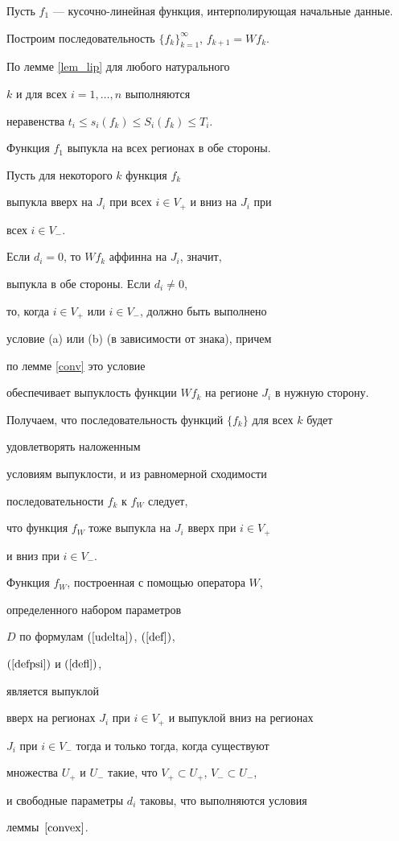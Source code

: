 \begin{pf}


Пусть $f_1$ --- кусочно-линейная функция, интерполирующая начальные данные.


Построим последовательность $\{f_k\}_{k=1}^{\infty}$, $f_{k+1} = W f_k$.


По лемме \ref{lem_lip} для любого натурального


$ k $ и для всех $i=1,\dotsc,n $ выполняются


неравенства $ t_i \le s_i (f_k) \le S_i(f_k) \le T_i $.


Функция $f_1$ выпукла на всех регионах в обе стороны.


Пусть для некоторого $k$ функция $f_k$


выпукла вверх на $J_i$ при всех $i \in V_+$ и вниз на $J_i$ при


всех $i \in V_-$.


Если $d_i = 0 $, то $W f_k$ аффинна на $J_i$, значит,


выпукла в обе стороны. Если $d_i \ne 0 $,


то, когда $i\in V_+$ или $i\in V_-$, должно быть выполнено


условие (a) или (b) (в зависимости от знака), причем


по лемме \ref{conv} это условие


обеспечивает выпуклость функции $W f_k$ на регионе $J_i$ в нужную сторону.


Получаем, что последовательность функций $\{ f_k \} $ для всех $k$ будет


удовлетворять наложенным


условиям выпуклости, и из равномерной сходимости


последовательности $ f_k $ к $ f_W $ следует,


что функция $ f_W $ тоже выпукла на $J_i$ вверх при $i \in V_+$


и вниз при $i \in V_-$.


\end{pf}





\begin{thm}


Функция $f_W$, построенная с помощью оператора $W$,


определенного набором параметров


$D$ по формулам $(\ref{udelta})$, $(\ref{def})$,


$(\ref{defpsi})$ и $(\ref{defl})$,


является выпуклой


вверх на регионах $J_i$ при $ i \in V_+$ и выпуклой вниз на регионах


$J_i$ при $ i \in V_-$ тогда и только тогда, когда существуют


множества $U_+ $ и $U_-$ такие, что $V_+ \subset U_+ $, $V_- \subset U_- $,


и свободные параметры $ d_i $ таковы, что выполняются условия


леммы~$\ref{convex}$.


\end{thm}





